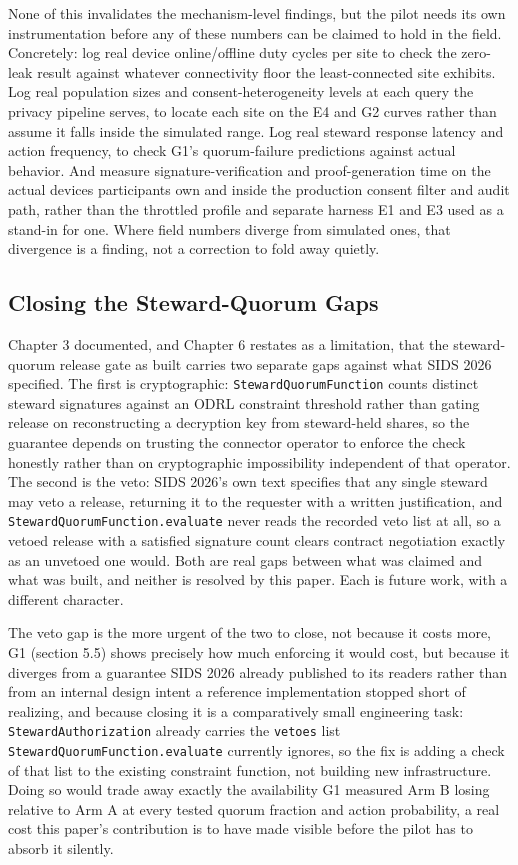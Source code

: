 None of this invalidates the mechanism-level findings, but the pilot needs its own instrumentation before any of these numbers can be claimed to hold in the field. Concretely: log real device online/offline duty cycles per site to check the zero-leak result against whatever connectivity floor the least-connected site exhibits. Log real population sizes and consent-heterogeneity levels at each query the privacy pipeline serves, to locate each site on the E4 and G2 curves rather than assume it falls inside the simulated range. Log real steward response latency and action frequency, to check G1's quorum-failure predictions against actual behavior. And measure signature-verification and proof-generation time on the actual devices participants own and inside the production consent filter and audit path, rather than the throttled profile and separate harness E1 and E3 used as a stand-in for one. Where field numbers diverge from simulated ones, that divergence is a finding, not a correction to fold away quietly.

\subsection{Closing the Steward-Quorum Gaps}

Chapter 3 documented, and Chapter 6 restates as a limitation, that the steward-quorum release gate as built carries two separate gaps against what SIDS 2026 specified. The first is cryptographic: \texttt{StewardQuorumFunction} counts distinct steward signatures against an ODRL constraint threshold rather than gating release on reconstructing a decryption key from steward-held shares, so the guarantee depends on trusting the connector operator to enforce the check honestly rather than on cryptographic impossibility independent of that operator. The second is the veto: SIDS 2026's own text specifies that any single steward may veto a release, returning it to the requester with a written justification, and \texttt{StewardQuorumFunction.evaluate} never reads the recorded veto list at all, so a vetoed release with a satisfied signature count clears contract negotiation exactly as an unvetoed one would. Both are real gaps between what was claimed and what was built, and neither is resolved by this paper. Each is future work, with a different character.

The veto gap is the more urgent of the two to close, not because it costs more, G1 (section 5.5) shows precisely how much enforcing it would cost, but because it diverges from a guarantee SIDS 2026 already published to its readers rather than from an internal design intent a reference implementation stopped short of realizing, and because closing it is a comparatively small engineering task: \texttt{StewardAuthorization} already carries the \texttt{vetoes} list \texttt{StewardQuorumFunction.evaluate} currently ignores, so the fix is adding a check of that list to the existing constraint function, not building new infrastructure. Doing so would trade away exactly the availability G1 measured Arm B losing relative to Arm A at every tested quorum fraction and action probability, a real cost this paper's contribution is to have made visible before the pilot has to absorb it silently.

